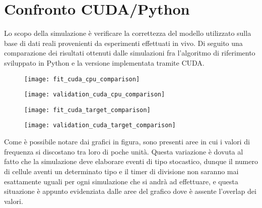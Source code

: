 \section{Confronto CUDA/Python}

Lo scopo della simulazione è verificare la correttezza del modello utilizzato
sulla base di dati reali provenienti da esperimenti effettuati in vivo.
Di seguito una comparazione dei risultati ottenuti dalle simulazioni fra
l'algoritmo di riferimento sviluppato in Python e la versione implementata
tramite CUDA.

\begin{figure}[H]
    \begin{minipage}[b]{.5\linewidth}
        \centering
        \texttt{[image: fit\_cuda\_cpu\_comparison]}
    \end{minipage}
    \begin{minipage}[b]{.5\linewidth}
        \centering
        \texttt{[image: validation\_cuda\_cpu\_comparison]}
    \end{minipage}
    \begin{minipage}[b]{.5\linewidth}
        \centering
        \texttt{[image: fit\_cuda\_target\_comparison]}
    \end{minipage}
    \begin{minipage}[b]{.5\linewidth}
        \centering
        \texttt{[image: validation\_cuda\_target\_comparison]}
    \end{minipage}
    \caption{}
\end{figure}

Come è possibile notare dai grafici in figura, sono presenti aree in cui
i valori di frequenza si discostano tra loro di poche unità. Questa variazione
è dovuta al fatto che la simulazione deve elaborare eventi di tipo stocastico,
dunque il numero di cellule aventi un determinato tipo e il timer di divisione
non saranno mai esattamente uguali per ogni simulazione che si andrà ad
effettuare, e questa situazione è appunto evidenziata dalle aree del grafico
dove è assente l'overlap dei valori. 
